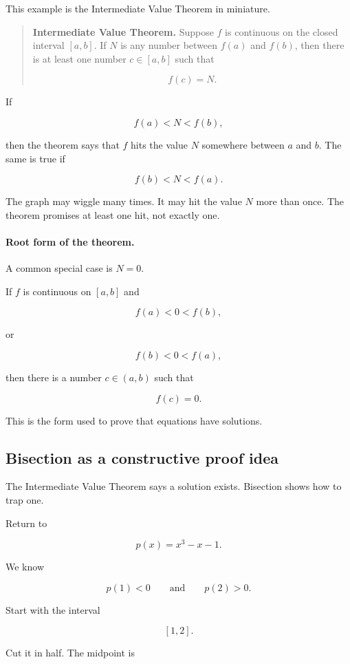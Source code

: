 This example is the Intermediate Value Theorem in miniature.

\begin{quote}
\textbf{Intermediate Value Theorem.}
Suppose \(f\) is continuous on the closed interval \([a,b]\).  If \(N\) is any number between \(f(a)\) and \(f(b)\), then there is at least one number \(c\in[a,b]\) such that

\[
f(c)=N.
\]
\end{quote}

If

\[
f(a)<N<f(b),
\]

then the theorem says that \(f\) hits the value \(N\) somewhere between \(a\) and \(b\).  The same is true if

\[
f(b)<N<f(a).
\]

The graph may wiggle many times.  It may hit the value \(N\) more than once.  The theorem promises at least one hit, not exactly one.

\paragraph{Root form of the theorem.}
A common special case is \(N=0\).

If \(f\) is continuous on \([a,b]\) and

\[
f(a)<0<f(b),
\]

or

\[
f(b)<0<f(a),
\]

then there is a number \(c\in(a,b)\) such that

\[
f(c)=0.
\]

This is the form used to prove that equations have solutions.

\subsection{Bisection as a constructive proof idea}
\label{subsec:bisection-proof-idea}

The Intermediate Value Theorem says a solution exists.  Bisection shows how to trap one.

Return to

\[
p(x)=x^3-x-1.
\]

We know

\[
p(1)<0
\qquad\text{and}\qquad
p(2)>0.
\]

Start with the interval

\[
[1,2].
\]

Cut it in half.  The midpoint is

